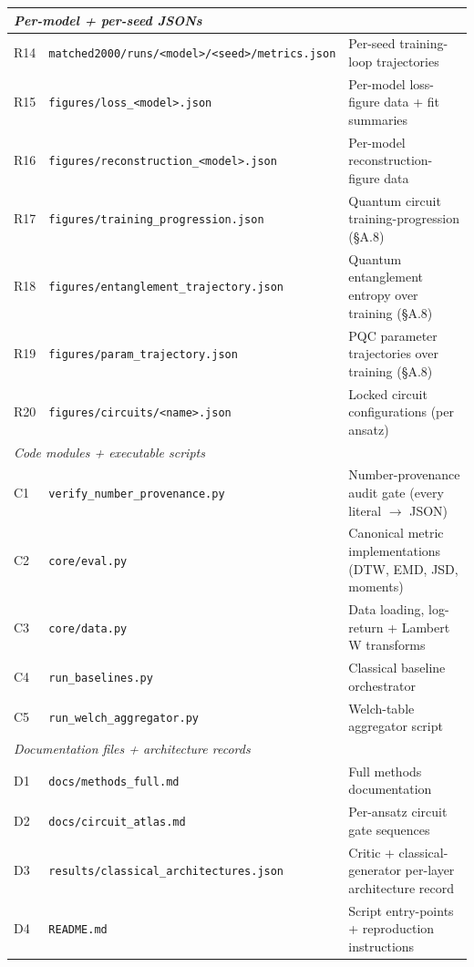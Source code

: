 \begin{table}[!htbp]
\begin{tabular}{@{}llp{6.0cm}@{}}
\midrule
\multicolumn{3}{l}{\textit{Per-model + per-seed JSONs}} \\
\midrule
R14 & \texttt{matched2000/runs/<model>/<seed>/metrics.json} & Per-seed training-loop trajectories \\
R15 & \texttt{figures/loss\_<model>.json}             & Per-model loss-figure data + fit summaries \\
R16 & \texttt{figures/reconstruction\_<model>.json}   & Per-model reconstruction-figure data \\
R17 & \texttt{figures/training\_progression.json}     & Quantum circuit training-progression (\S A.8) \\
R18 & \texttt{figures/entanglement\_trajectory.json}  & Quantum entanglement entropy over training (\S A.8) \\
R19 & \texttt{figures/param\_trajectory.json}         & PQC parameter trajectories over training (\S A.8) \\
R20 & \texttt{figures/circuits/<name>.json}           & Locked circuit configurations (per ansatz) \\
\midrule
\multicolumn{3}{l}{\textit{Code modules + executable scripts}} \\
\midrule
C1 & \texttt{verify\_number\_provenance.py}       & Number-provenance audit gate (every literal $\to$ JSON) \\
C2 & \texttt{core/eval.py}                        & Canonical metric implementations (DTW, EMD, JSD, moments) \\
C3 & \texttt{core/data.py}                        & Data loading, log-return + Lambert W transforms \\
C4 & \texttt{run\_baselines.py}                   & Classical baseline orchestrator \\
C5 & \texttt{run\_welch\_aggregator.py}           & Welch-table aggregator script \\
\midrule
\multicolumn{3}{l}{\textit{Documentation files + architecture records}} \\
\midrule
D1 & \texttt{docs/methods\_full.md}               & Full methods documentation \\
D2 & \texttt{docs/circuit\_atlas.md}              & Per-ansatz circuit gate sequences \\
D3 & \texttt{results/classical\_architectures.json} & Critic + classical-generator per-layer architecture record \\
D4 & \texttt{README.md}                           & Script entry-points + reproduction instructions \\
\bottomrule
\end{tabular}
\end{table}

